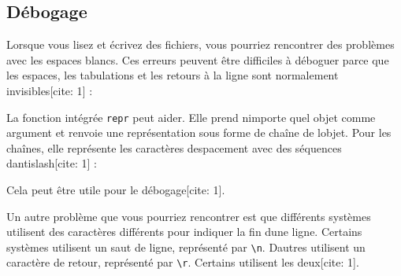 \hypertarget{duxe9bogage}{%
\subsection{Débogage}\label{duxe9bogage}}

Lorsque vous lisez et écrivez des fichiers, vous pourriez rencontrer des
problèmes avec les espaces blancs. Ces erreurs peuvent être difficiles à
déboguer parce que les espaces, les tabulations et les retours à la
ligne sont normalement invisibles{[}cite: 1{]} :

\begin{Shaded}
\begin{Highlighting}[]
\OperatorTok{\textgreater{}\textgreater{}\textgreater{}}\OperatorTok{=} \StringTok{ 4\textquotesingle{}}
\OperatorTok{\textgreater{}\textgreater{}\textgreater{}} 
   
\end{Highlighting}
\end{Shaded}

La fonction intégrée \texttt{repr} peut aider. Elle prend
n\textquotesingle importe quel objet comme argument et renvoie une
représentation sous forme de chaîne de l\textquotesingle objet. Pour les
chaînes, elle représente les caractères d\textquotesingle espacement
avec des séquences d\textquotesingle antislash{[}cite: 1{]} :

\begin{Shaded}
\begin{Highlighting}[]
\OperatorTok{\textgreater{}\textgreater{}\textgreater{}}  
\CommentTok{ 4\textquotesingle{}}
\end{Highlighting}
\end{Shaded}

Cela peut être utile pour le débogage{[}cite: 1{]}.

Un autre problème que vous pourriez rencontrer est que différents
systèmes utilisent des caractères différents pour indiquer la fin
d\textquotesingle une ligne. Certains systèmes utilisent un saut de
ligne, représenté par \texttt{\textbackslash{}n}.
D\textquotesingle autres utilisent un caractère de retour, représenté
par \texttt{\textbackslash{}r}. Certains utilisent les deux{[}cite:
1{]}.

